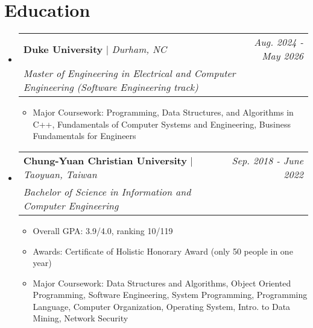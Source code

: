 \documentclass[letterpaper,11pt]{article}
\makeatletter
\newcommand{\subheadingtitlevspace}{
\vspace{-3pt}
}
\newcommand{\resumeItem}[1]{
  \item{
    {#1}\vspace{-4pt}
  }
}
\newcommand{\resumeSubheading}[4]{
   \item
     \begin{tabular*}{0.97\textwidth}[t]{l@{\extracolsep{\fill}}r}
       \textbf{#1} | \emph{#2} & \textit{#4}\\
       \textit{#3} \\
     \end{tabular*}\vspace{-8pt}
 }
\newcommand{\resumeSubHeadingListStart}{\subheadingtitlevspace\begin{itemize}[leftmargin=0in, label={}]}
\newcommand{\resumeSubHeadingListEnd}{\end{itemize}}
\newcommand{\resumeItemListStart}{
\begin{itemize}[label={$\bullet$}, labelsep=8pt, itemsep=4pt]}
\newcommand{\resumeItemListEnd}{
\end{itemize}\vspace{-8pt}}
\makeatother
\begin{document}


\section{Education}
  \resumeSubHeadingListStart
    \resumeSubheading
      {Duke University}{Durham, NC}
      {Master of Engineering in Electrical and Computer Engineering (Software Engineering track)} 
      {Aug. 2024 - May 2026} %
      \resumeItemListStart
      \resumeItem{Major Coursework: Programming, Data Structures, and Algorithms in C++, Fundamentals of Computer Systems and Engineering, Business Fundamentals for Engineers} 
      \resumeItemListEnd
    \resumeSubheading
      {Chung-Yuan Christian University} {Taoyuan, Taiwan}
      {Bachelor of Science in Information and Computer Engineering} 
      {Sep. 2018 - June 2022}
      \resumeItemListStart
        \resumeItem{Overall GPA: 3.9/4.0, ranking 10/119}
        \resumeItem{Awards: Certificate of Holistic Honorary Award (only 50 people in one year)}
        \resumeItem{Major Coursework: Data Structures and Algorithms, Object Oriented Programming, Software Engineering, System Programming, Programming Language, Computer Organization, Operating System, 
                    Intro. to Data Mining, Network Security} 
      \resumeItemListEnd
  \resumeSubHeadingListEnd

   
\end{document}
